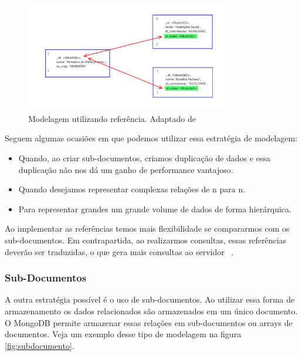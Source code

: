 	\begin{figure}[!htbp]
		\begin{center}
			\includegraphics[width=0.8\textwidth]{referencia}
		\end{center}
		\caption{ Modelagem utilizando referência. Adaptado de ~\cite{sitemongodb}}
		\label{fig:referencia}
	\end{figure}

Seguem algumas ocasiões em que podemos utilizar essa estratégia de modelagem:

\begin{itemize}
	\item Quando, ao criar sub-documentos, criamos duplicação de dados e essa duplicação não nos dá um ganho de performance vantajoso.
	\item Quando desejamos representar complexas relações de n para n.
	\item Para representar grandes um grande volume de dados de forma hierárquica.
\end{itemize}

Ao implementar as referências temos mais flexibilidade se compararmos com os sub-documentos. Em contrapartida, ao realizarmos consultas, essas referências deverão ser traduzidas, o que gera mais consultas ao servidor ~\cite{Orendanalysisand}.

\subsubsection{Sub-Documentos}

A outra estratégia possível é o uso de sub-documentos. Ao utilizar essa forma de armazenamento os dados relacionados são armazenados em um único documento. O MongoDB permite armazenar essas relações em sub-documentos ou arrays de documentos. Veja um exemplo desse tipo de modelagem na figura \ref{fig:subdocumento}.

